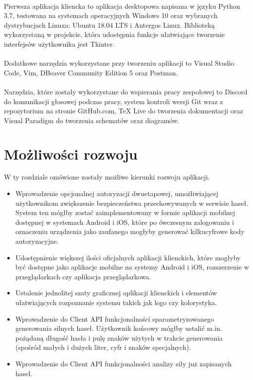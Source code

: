 \documentclass{article}
\begin{document}
	\paragraph*{} Pierwsza aplikacja kliencka to aplikacja desktopowa napisana w języku Python 3.7, testowana na systemach operacyjnych Windows 10 oraz wybranych dystrybucjach Linuxa: Ubuntu 18.04 LTS i Antergos Linux. Biblioteką wykorzystaną w projekcie, która udostępnia funkcje ułatwiające tworzenie interfejsów użytkownika jest Tkinter.
	\paragraph*{} Dodatkowe narzędzia wykorzystane przy tworzeniu aplikacji to Visual Studio Code, Vim, DBeaver Community Edition 5 oraz Postman.
	\paragraph*{} Narzędzia, które zostały wykorzystane do wspierania pracy zespołowej to Discord do komunikacji głosowej podczas pracy, system kontroli wersji Git wraz z repozytorium na stronie GitHub.com, TeX Live do tworzenia dokumentacji oraz Visual Paradigm do tworzenia schematów oraz diagramów.

    \section{Możliwości rozwoju}
    W ty rozdziale omówione zostały możliwe kierunki rozwoju aplikacji.

    \begin{itemize}
		\item Wprowadzenie opcjonalnej autoryzacji dwuetapowej, umożliwiającej użytkownikom zwiększenie bezpieczeństwa przechowywanych w serwisie haseł. System ten mógłby zostać zaimplementowany w formie aplikacji mobilnej dostępnej w systemach Android i iOS, które po ówczesnym zalogowaniu i oznaczeniu urządzenia jako zaufanego mogłyby generować kilkucyfrowe kody autoryzacyjne.
		\item Udostępnienie większej ilości oficjalnych aplikacji klienckich, które mogłyby być dostępne jako aplikacje mobilne na systemy Android i iOS, rozszerzenie w przeglądarkach czy aplikacja przeglądarkowa.
		\item Ustalenie jednolitej szaty graficznej aplikacji klienckich i elementów ułatwiających rozpoznanie systemu takich jak logo czy kolorystyka.
        \item Wprowadzenie do Client API funkcjonalności sparametryzowanego generowania silnych haseł. Użytkownik końcowy mógłby ustalić m.in. pożądaną długość hasła i pulę znaków użytych w trakcie generowania (spośród małych i dużych liter, cyfr i znaków specjalnych).
        \item Wprowadzenie do Client API funkcjonalności analizy siły już zapisanych haseł.
	\end{itemize}
\end{document}
